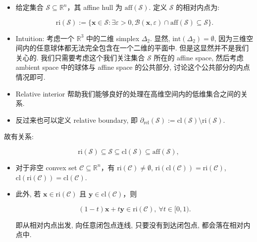 \begin{defblock}
\begin{itemize}
\item {}给定集合 $\mathcal{S} \subseteq \mathbb{R}^n$，其 affine hull 为 $\text{aff}(\mathcal{S})$. 定义 $\mathcal{S}$ 的相对内点为:

\[
\text{ri}(\mathcal{S}) := \{\bm{x} \in \mathcal{S}: \exists \varepsilon > 0, \mathcal{B}(\bm{x}, \varepsilon) \cap \text{aff}(\mathcal{S}) \subseteq \mathcal{S}\}.
\]


\item {}Intuition: 考虑一个 $\mathbb{R}^3$ 中的二维 simplex $\Delta_2$. 显然, $\text{int}(\Delta_2) = \emptyset$, 因为三维空间内的任意球体都无法完全包含在一个二维的平面中. 但是这显然并不是我们关心的. 我们只需要考虑这个我们关注集合 $\mathcal{S}$ 所在的 affine space, 然后考虑 ambient space 中的球体与 affine space 的公共部分, 讨论这个公共部分的内点情况即可.


\item {}Relative interior 帮助我们能够良好的处理在高维空间内的低维集合之间的关系.


\item {}反过来也可以定义 relative boundary, 即 $\partial_{\text{rel}}(\mathcal{S}) := \text{cl}(\mathcal{S}) \setminus \text{ri}(\mathcal{S})$.


\end{itemize}

故有关系:

\[
\text{ri}(\mathcal{S}) \subseteq \mathcal{S} \subseteq \text{cl}(\mathcal{S}) \subseteq \text{aff}(\mathcal{S}),
\]

\end{defblock}


\begin{propositionblock}
\begin{itemize}
\item {}对于非空 convex set $\mathcal{C} \subseteq \mathbb{R}^n$，有 $\text{ri}(\mathcal{C}) \neq \emptyset$, $\text{ri}(\text{cl}(\mathcal{C})) = \text{ri}(\mathcal{C})$, $\text{cl}(\text{ri}(\mathcal{C})) = \text{cl}(\mathcal{C})$.


\item {}此外, 若 $\bm{x} \in \text{ri}(\mathcal{C})$ 且 $\bm{y} \in \text{cl}(\mathcal{C})$，则

\[
(1-t) \bm{x} + t \bm{y} \in \text{ri}(\mathcal{C}),~ \forall t \in [0,1).
\]

即从相对内点出发, 向任意闭包点连线, 只要没有到达闭包点, 都会落在相对内点中.


\end{itemize}

\end{propositionblock}

